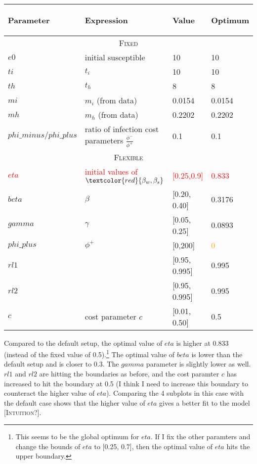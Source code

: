 \documentclass{../cls/NotesV2_Class}
\begin{document}
\begin{center}
\begin{tabular}[h]{ |p{3cm}||p{6cm}|p{2cm}|p{2cm}|  }
 \hline
 \begin{center}Parameter\end{center} & \begin{center}Expression\end{center} & \begin{center}Value\end{center} & \begin{center}Optimum\end{center} \\
 \hline
 \hline
 \multicolumn{4}{|c|}{\textsc{Fixed}} \\
 \hline
 $e0$   &  initial susceptible  & 10 & 10\\
 $ti$ & $t_i$ & 10 & 10 \\
 $th$ & $t_h$ & 8 & 8\\
 $mi$ & $m_i$ (from data) & 0.0154 & 0.0154 \\
 $mh$ & $m_h$ (from data) & 0.2202 & 0.2202\\
 $phi\_minus/phi\_plus$ & ratio of infection cost parameters $\frac{\phi^-}{\phi^+}$ & 0.1 & 0.1 \\
 \hline
 \multicolumn{4}{|c|}{\textsc{Flexible}} \\
 \hline
 \textcolor{red}{$eta$} & \textcolor{red}{initial values of }$\textcolor{red}{\beta_w,\beta_s}$ & \textcolor{red}{[0.25,0.9]} & \textcolor{red}{0.833} \\
 $beta$ & $\beta$ & [0.20, 0.40] & 0.3176\\
 $gamma$ & $\gamma$ & [0.05, 0.25] & 0.0893 \\
 $phi\_plus$ & $\phi^+$ & [0,200] & \textcolor{orange}{0}\\
 $rl1$ & & [0.95, 0.995] & 0.995\\
 $rl2$ & & [0.95, 0.995] & 0.995\\
 $c$ & cost parameter $c$ & [0.01, 0.50] & 0.5\\
 \hline
\end{tabular}
\end{center}

Compared to the default setup, the optimal value of $eta$ is higher at 0.833 (instead of the fixed value of 0.5).\footnote{This seems to be the global optimum for $eta$. If I fix the other paramters and change the bounds of $eta$ to [0.25, 0.7], then the optimal value of $eta$ hits the upper boundary.} The optimal value of $beta$ is lower than the default setup and is closer to 0.3. The $gamma$ parameter is slightly lower as well. $rl1$ and $rl2$ are hitting the boundaries as before, and the cost paramter $c$ has increased to hit the boundary at 0.5 (I think I need to increase this boundary to counteract the higher value of $eta$). Comparing the 4 subplots in this case with the default case shows that the higher value of $eta$ gives a better fit to the model [\textsc{Intuition}?].
\end{document}
